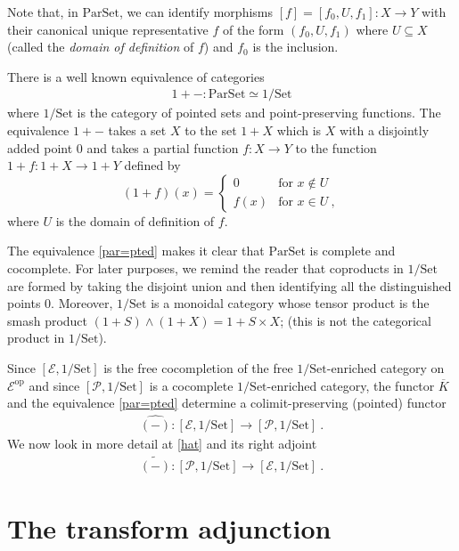 \documentclass[a4paper,12pt,reqno]{amsart}
\theoremstyle{definition}
\theoremstyle{fact}
\theoremstyle{genquest}
\theoremstyle{step}
\newcommand{\lra}{\longrightarrow}
\def\CE{{\mathscr E}}
\def\CP{{\mathscr P}}
\begin{document}
Note that, in $\mathrm{Par}\mathrm{Set}$, we can identify morphisms
$[f] = [f_0,U,f_1]:X\lra Y$ with their canonical unique representative $f$
of the form $(f_0,U,f_1)$ where $U\subseteq X$ 
(called the {\em domain of definition} of $f$) and $f_0$ is the inclusion.   

There is a well known equivalence of categories
\begin{eqnarray}\label{par=pted}
1+- : \mathrm{Par}\mathrm{Set} \simeq 1/\mathrm{Set}
\end{eqnarray}
where $1/\mathrm{Set}$ is the category of pointed sets 
and point-preserving functions. The equivalence $1+-$ takes a set
$X$ to the set $1+X$ which is $X$ with a disjointly added point $0$ and takes
a partial function $f : X \lra Y$ to the function $1+f : 1+X \lra 1+Y$ defined by 
\begin{equation*}
(1+f)(x) =
\begin{cases}
0 & \text{for }  x\notin U \\
f(x) & \text{for } x \in U \ ,
\end{cases}
\end{equation*}
where $U$ is the domain of definition of $f$.

The equivalence \eqref{par=pted} makes it clear that $\mathrm{Par}\mathrm{Set}$
is complete and cocomplete. 
For later purposes, we remind the reader that coproducts in $1/\mathrm{Set}$
are formed by taking the disjoint union and then identifying all the distinguished
points $0$. Moreover, $1/\mathrm{Set}$ is a monoidal category whose tensor
product is the smash product $(1+S)\wedge (1+X) = 1 + S\times X$;
(this is not the categorical product in $1/\mathrm{Set}$).

Since $[\CE, 1/\mathrm{Set}]$ is the free cocompletion of the free $1/\mathrm{Set}$-enriched category on $\CE^{\mathrm{op}}$ and
since $[\CP,1/\mathrm{Set}]$ is a cocomplete $1/\mathrm{Set}$-enriched category, the functor $\overline{K}$ and the equivalence \eqref{par=pted}
determine a colimit-preserving (pointed) functor
\begin{eqnarray}\label{hat}
\widehat{(-)} : [\CE, 1/\mathrm{Set}] \lra [\CP, 1/\mathrm{Set}] \ . 
\end{eqnarray}
We now look in more detail at \eqref{hat} and its right adjoint 
\begin{eqnarray}\label{tilde}
\widetilde{(-)} : [\CP, 1/\mathrm{Set}] \lra [\CE, 1/\mathrm{Set}] \ . 
\end{eqnarray}  

\section{The transform adjunction}\label{ta}
\end{document}
